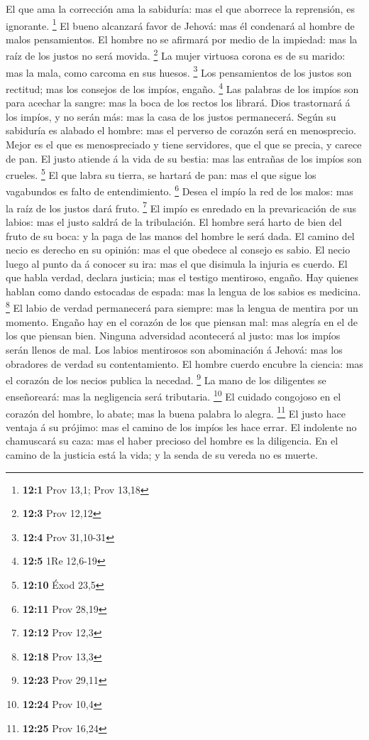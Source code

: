  El que ama la corrección ama la sabiduría: mas el que
aborrece la reprensión, es ignorante. \footnote{\textbf{12:1} Prov 13,1;
  Prov 13,18}  El bueno alcanzará favor de Jehová: mas él
condenará al hombre de malos pensamientos.  El hombre no se
afirmará por medio de la impiedad: mas la raíz de los justos no será
movida. \footnote{\textbf{12:3} Prov 12,12}  La mujer
virtuosa corona es de su marido: mas la mala, como carcoma en sus
huesos. \footnote{\textbf{12:4} Prov 31,10-31}  Los
pensamientos de los justos son rectitud; mas los consejos de los impíos,
engaño. \footnote{\textbf{12:5} 1Re 12,6-19}  Las palabras
de los impíos son para acechar la sangre: mas la boca de los rectos los
librará.  Dios trastornará á los impíos, y no serán más: mas
la casa de los justos permanecerá.  Según su sabiduría es
alabado el hombre: mas el perverso de corazón será en menosprecio.
 Mejor es el que es menospreciado y tiene servidores, que el
que se precia, y carece de pan.  El justo atiende á la vida
de su bestia: mas las entrañas de los impíos son crueles. \footnote{\textbf{12:10}
  Éxod 23,5}  El que labra su tierra, se hartará de pan:
mas el que sigue los vagabundos es falto de entendimiento. \footnote{\textbf{12:11}
  Prov 28,19}  Desea el impío la red de los malos: mas la
raíz de los justos dará fruto. \footnote{\textbf{12:12} Prov 12,3}
 El impío es enredado en la prevaricación de sus labios:
mas el justo saldrá de la tribulación.  El hombre será
harto de bien del fruto de su boca: y la paga de las manos del hombre le
será dada.  El camino del necio es derecho en su opinión:
mas el que obedece al consejo es sabio.  El necio luego al
punto da á conocer su ira: mas el que disimula la injuria es cuerdo.
 El que habla verdad, declara justicia; mas el testigo
mentiroso, engaño.  Hay quienes hablan como dando estocadas
de espada: mas la lengua de los sabios es medicina. \footnote{\textbf{12:18}
  Prov 13,3}  El labio de verdad permanecerá para siempre:
mas la lengua de mentira por un momento.  Engaño hay en el
corazón de los que piensan mal: mas alegría en el de los que piensan
bien.  Ninguna adversidad acontecerá al justo: mas los
impíos serán llenos de mal.  Los labios mentirosos son
abominación á Jehová: mas los obradores de verdad su contentamiento.
 El hombre cuerdo encubre la ciencia: mas el corazón de los
necios publica la necedad. \footnote{\textbf{12:23} Prov 29,11}
 La mano de los diligentes se enseñoreará: mas la
negligencia será tributaria. \footnote{\textbf{12:24} Prov 10,4}
 El cuidado congojoso en el corazón del hombre, lo abate;
mas la buena palabra lo alegra. \footnote{\textbf{12:25} Prov 16,24}
 El justo hace ventaja á su prójimo: mas el camino de los
impíos les hace errar.  El indolente no chamuscará su caza:
mas el haber precioso del hombre es la diligencia.  En el
camino de la justicia está la vida; y la senda de su vereda no es
muerte.

